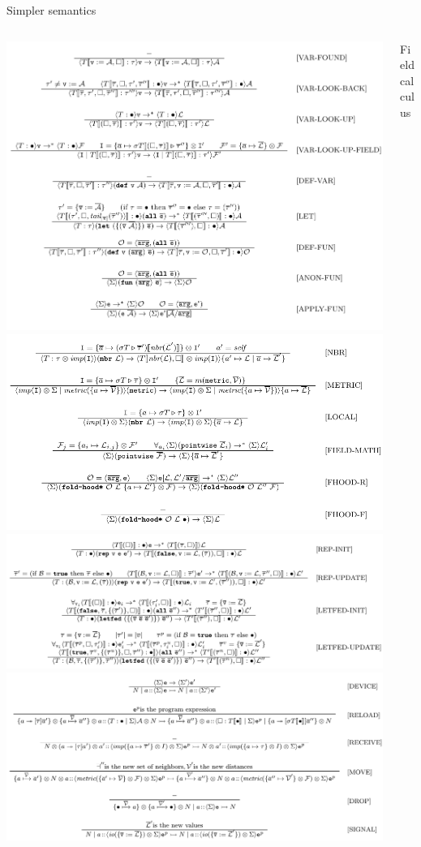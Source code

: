\documentclass[presentation]{beamer} %
\begin{document}
\begin{frame}[fragile]{Simpler semantics}
\begin{columns}
\begin{column}{6cm}
\begin{framed}
        \includegraphics[width=0.39\columnwidth]{imgs/protosem13} 
        \includegraphics[width=0.59\columnwidth]{imgs/protosem16} \\
        \includegraphics[width=0.49\columnwidth]{imgs/protosem15} 
        \includegraphics[width=0.49\columnwidth]{imgs/protosem17} 
      \end{framed}
    \end{column}
    \begin{column}{6cm}
      \centering
      Field calculus \\
      \begin{framed}

\end{framed}
\end{column}
\end{columns}
\end{frame}
\end{document}
